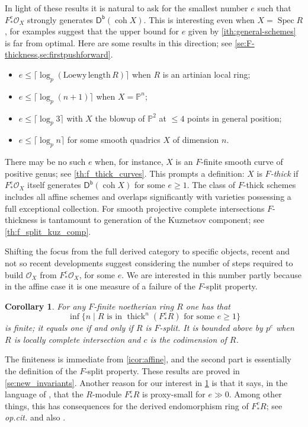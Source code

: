 \documentclass{amsart}
\newcommand{\coh}{\operatorname{coh}}
\newcommand{\dbcat}[1]{\cat{D}^{\mathsf{b}}(#1)}
\newcommand{\mco}{\mathcal{O}}
\newcommand{\cat}[1]{{\mathsf{#1}}}
\newcommand{\spec}{\operatorname{Spec}}
\newcommand{\thick}{\operatorname{thick}}
\newcounter{intro}
\newtheorem{introcor}[intro]{Corollary}
\theoremstyle{definition}
\theoremstyle{remark}
\numberwithin{equation}{subsection}
\begin{document}
In light of these results it is natural to ask for the smallest number $e$ such that $F^e_*\mco_X$ strongly generates $\dbcat{\coh X}$. This is interesting even when $X=\spec R$, for examples suggest that the upper bound for $e$ given by \cref{ith:general-schemes} is far from optimal. Here are some results in this direction; see \cref{se:F-thickness,se:firstpushforward}.
\begin{itemize}
\item
$e\le \lceil\log_p(\mathrm{Loewy\,length}\, R)\rceil$ when $R$ is an artinian local ring; 
\item
$e\le \lceil \log_p(n+1)\rceil$ when $X=\mathbb{P}^n$;
\item
$e\le \lceil \log_p3\rceil$ with $X$ the blowup of $\mathbb{P}^2$ at $\le 4$ points in general position;
\item
$e\le \lceil\log_pn\rceil$ for some smooth quadrics $X$ of dimension $n$.
\end{itemize}
 There may be no such $e$ when, for instance, $X$ is an $F$-finite smooth curve of positive genus; see \cref{th:f_thick_curves}. This prompts a definition: $X$ is \emph{$F$-thick} if $F^e_*\mco_X$ itself generates $\dbcat{\coh X}$ for some $e\ge 1$. The class of $F$-thick schemes includes all affine schemes and overlaps significantly with varieties possessing a full exceptional collection. For smooth projective complete intersections $F$-thickness is tantamount to generation of the Kuznetsov component; see \cref{th:f_split_kuz_comp}.

Shifting the focus from the full derived category to specific objects, recent and not so recent developments suggest considering the number of steps required to build $\mco_X$ from $F^e_*\mco_X$, for some $e$. We are interested in this number partly because in the affine case it is one measure of a failure of the $F$-split property.

\begin{introcor}
 \label{icor:fLevelFSplit}
For any $F$-finite noetherian ring $R$ one has that
\[
\inf\{n\mid \text{$R$ is in $\thick^n(F^e_*R)$ for some $e\ge 1$}\}
\]
is finite; it equals one if and only if $R$ is $F$-split. It is bounded above by $p^c$ when $R$ is locally complete intersection and $c$ is the codimension of $R$.
\end{introcor}

The finiteness is immediate from \cref{icor:affine}, and the second part is essentially the definition of the $F$-split property. These results are proved in \cref{se:new_invariants}. Another reason for our interest in \cref{icor:fLevelFSplit}  is that it says, in the language of \cite{Dwyer/Greenlees/Iyengar:2006b}, that the $R$-module $F^e_*R$ is proxy-small for $e\gg 0$. Among other things, this has consequences for the derived endomorphism ring of $F^e_*R$; see \emph{op.\@ cit.\@} and also \cite{Dwyer/Greenlees/Iyengar:2006a}.
\end{document}
